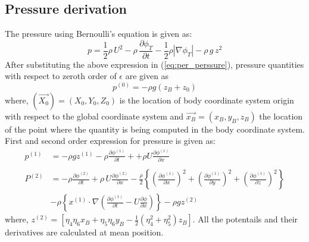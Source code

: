 \subsection{Pressure derivation}
The pressure using Bernoulli's equation is given as:
\begin{equation}
    \label{eq:pressure}
    p = \frac{1}{2}\rho\,U^2 - \rho\,\frac{\partial \phi_T}{\partial t} - \frac{1}{2}\rho |\nabla\phi_T|-\rho\,g\,z^2
\end{equation} 
After substituting the above expression in (\ref{eq:per_perssure}), pressure quantities with respect 
to zeroth order of $\epsilon$ are given as 
\begin{equation}
    \label{eq:pressure_zero}
    p^{(0)} = - \rho g(z_B + z_0)
\end{equation}
where, $(\vec{X_0}) = (X_0, Y_0, Z_0)$ is the location of body coordinate system origin with respect to the global 
coordinate system and $\vec{x_B}=(x_B, y_B, z_B)$ the location of the point where the quantity is being computed in the body coordinate
system.
First and second order expression for pressure is given as:
\begin{align}
    \label{eq:pressure_first}
    p^{(1)} &= -\rho g z^{(1)} - \rho\frac{\partial \phi^{(1)}}{\partial t} +
    +\rho U\frac{\partial \phi^{(1)}}{\partial x}
    \\ \nonumber \\
    \label{eq:pressure_second}
    P^{(2)} &= -\rho\frac{\partial \phi^{(2)}}{\partial t} + \rho\,U\frac{\partial \phi^{(2)}}{\partial x} -\frac{\rho}{2}
    \left\{\left(\frac{\partial \phi^{(1)}}{\partial x}\right)^2 + \left(\frac{\partial \phi^{(1)}}{\partial y}\right)^2 + 
    \left(\frac{\partial \phi^{(1)}}{\partial z}\right)^2\right\} \\ \nonumber
    &-\rho\left\{x^{(1)}\cdot\nabla \left(\frac{\partial \phi^{(1)}}{\partial t} - U\frac{\partial \phi}{\partial x}\right)\right\}
    - \rho g z^{(2)}
\end{align}
where, $z^{(2)} = [\eta_4\eta_6 x_B + \eta_5\eta_6 y_B - \frac{1}{2}(\eta_4^2 + \eta_5^2)z_B]$. All the potentails and 
their derivatives are calculated at mean position.
